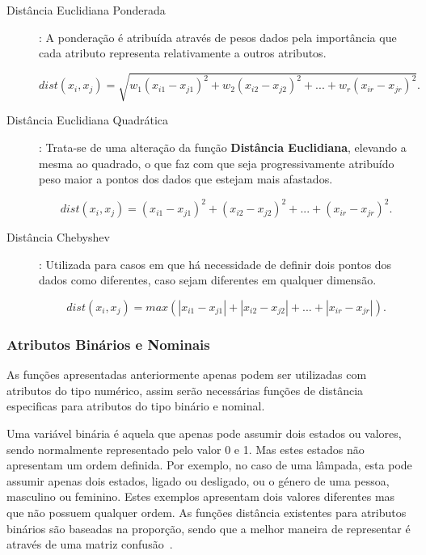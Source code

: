 \begin{description}
\item[Distância Euclidiana Ponderada]: A ponderação é atribuída através de pesos dados pela importância que cada atributo representa relativamente a outros atributos.

\begin{equation}
dist(x_{i}, x_{j}) = \sqrt{w_{1}(x_{i1} - x_{j1})^2 + w_{2}(x_{i2} - x_{j2})^2 +...+ w_{r}(x_{ir} - x_{jr})^2}.
\end{equation} 

\item[Distância Euclidiana Quadrática]: Trata-se de uma alteração da função \textbf{Distância Euclidiana}, elevando a mesma ao quadrado, o que faz com que seja progressivamente atribuído peso maior a pontos dos dados que estejam mais afastados.

\begin{equation}
dist(x_{i}, x_{j}) = (x_{i1} - x_{j1})^2 + (x_{i2} - x_{j2})^2 +...+ (x_{ir} - x_{jr})^2.
\end{equation}

\item[Distância Chebyshev]: Utilizada para casos em que há necessidade de definir dois pontos dos dados como diferentes, caso sejam diferentes em qualquer dimensão.

\begin{equation}
dist(x_{i}, x_{j}) = max(|x_{i1} - x_{j1}| + |x_{i2} - x_{j2}| +...+ |x_{ir} - x_{jr}|).
\label{eq:cheby}
\end{equation}

\end{description}

\subsubsection{Atributos Binários e Nominais}

As funções apresentadas anteriormente apenas podem ser utilizadas com atributos do tipo numérico, assim serão necessárias funções de distância especificas para atributos do tipo binário e nominal.

Uma variável binária é aquela que apenas pode assumir dois estados ou valores, sendo normalmente representado pelo valor 0 e 1. Mas estes estados não apresentam um ordem definida. Por exemplo, no caso de uma lâmpada, esta pode assumir apenas dois estados, ligado ou desligado, ou o género de uma pessoa, masculino ou feminino. Estes exemplos apresentam dois valores diferentes mas que não possuem qualquer ordem. As funções distância existentes para atributos binários são baseadas na proporção, sendo que a melhor maneira de representar é através de uma matriz confusão~\citet{Liu2011}.

